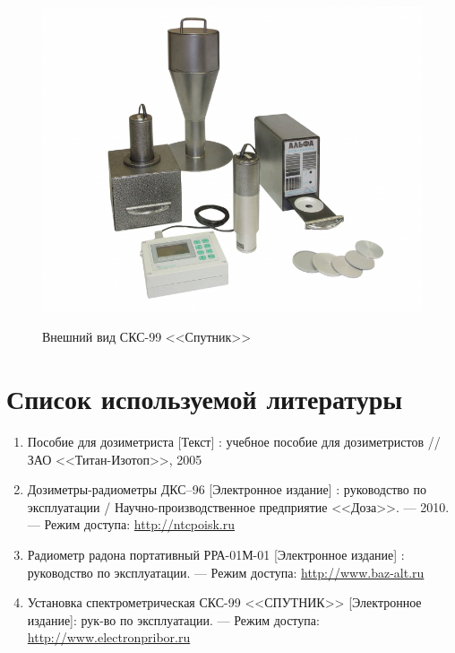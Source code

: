 \documentclass[14pt,pscyr,titlepage]{hedreport}
\begin{document}
		\begin{figure}[h!]
			\center
			\includegraphics[width=.8\textwidth]{CKC-99} \\
			\caption{Внешний вид СКС-99 <<Спутник>>}
		\end{figure}

	\pagebreak

	\section{Список используемой литературы}
	\begin{enumerate}\itemsep-2pt
		\item Пособие для дозиметриста [Текст] : учебное пособие для 
			дозиметристов // ЗАО <<Титан-Изотоп>>, 2005
		\item Дозиметры-радиометры ДКС–96 [Электронное издание] : руководство 
			по эксплуатации / Научно-производственное предприятие 
			<<Доза>>. --- 2010. --- Режим доступа: 
        	\href{http://ntcpoisk.ru/d/350762/d/dozimetri_radiometridks96.pdf}
        		{http://ntcpoisk.ru}  
        \item Радиометр радона портативный РРА-01М-01 [Электронное издание] : 
        	руководство по эксплуатации. --- Режим доступа:
        	\href{http://www.baz-alt.ru/userfiles/files/sks.pdf}
        		{http://www.baz-alt.ru}  
        \item Установка спектрометрическая СКС-99 <<СПУТНИК>> 
			[Электронное издание]: рук-во по эксплуатации. --- Режим доступа: \\
			\href{http://www.electronpribor.ru/resources/docs/RE_PPA_01_01ispr.pdf}
				{http://www.electronpribor.ru}
	\end{enumerate}
\end{document}
